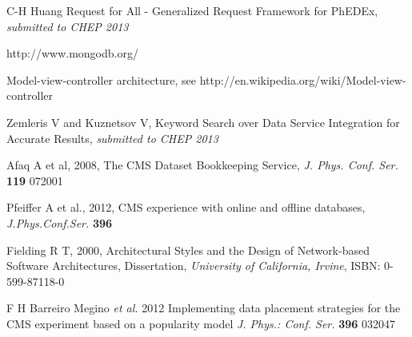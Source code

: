 \begin{thebibliography}{1}
C-H Huang Request for All - Generalized Request Framework for PhEDEx,
{\it submitted to CHEP 2013}

http://www.mongodb.org/

 Model-view-controller architecture, see
http://en.wikipedia.org/wiki/Model-view-controller

 Zemleris V and Kuznetsov V,
Keyword Search over Data Service Integration for Accurate Results,
{\it submitted to CHEP 2013}

 Afaq A et al, 2008, The CMS Dataset Bookkeeping Service, 
{\it J. Phys. Conf. Ser.} 
{\bf 119} 072001

 Pfeiffer A et al., 2012, CMS experience with online and offline databases, 
{\it J.Phys.Conf.Ser.} 
{\bf 396}

 Fielding R T, 2000, Architectural Styles and the Design of Network-based Software Architectures, Dissertation, 
{\it University of California, Irvine}, 
ISBN: 0-599-87118-0

 F H Barreiro Megino {\it et al.} 2012 Implementing data placement strategies for the CMS experiment based on a popularity model 
{\it J. Phys.: Conf. Ser.} {\bf 396} 032047

\end{thebibliography}
